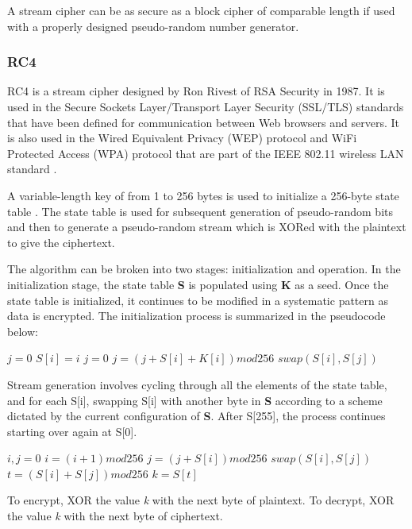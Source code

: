 \documentclass{article}
\begin{document}
A stream cipher can be as secure as a block cipher of comparable length if used with a properly designed pseudo-random number generator.

\subsubsection{RC4}
RC4 is a stream cipher designed by Ron Rivest of RSA Security in 1987. It is used in the Secure Sockets Layer/Transport Layer Security (SSL/TLS) standards that have been defined for communication between Web browsers and servers. It is also used in the Wired Equivalent Privacy (WEP) protocol and WiFi Protected Access (WPA) protocol that are part of the IEEE 802.11 wireless LAN standard \cite{stallings2011}.

A variable-length key of from 1 to 256 bytes is used to initialize a 256-byte state table \cite{mousa2006}. The state table is used for subsequent generation of pseudo-random bits and then to generate a pseudo-random stream which is XORed with the plaintext to give the ciphertext.

The algorithm can be broken into two stages: initialization and operation. In the initialization stage, the state table \textbf{S} is populated using \textbf{K} as a seed. Once the state table is initialized, it continues to be modified in a systematic pattern as data is encrypted. The initialization process is summarized in the pseudocode below:

\begin{algorithmic}
\State $j = 0$
	\State $S[i] = i$
\EndFor
\State $j = 0$
	\State $j = (j + S[i] + K[i]) mod 256$
	\State $swap(S[i], S[j])$
\EndFor
\end{algorithmic}

Stream generation involves cycling through all the elements of the state table, and for each S[i], swapping S[i] with another byte in \textbf{S} according to a scheme dictated by the current configuration of \textbf{S}. After S[255], the process continues starting over again at S[0].

\begin{algorithmic}
\State $i, j = 0$
	\State $i = (i + 1) mod 256$
	\State $j = (j + S[i]) mod 256$
	\State $swap(S[i], S[j])$
	\State $t = (S[i] + S[j]) mod 256$
	\State $k = S[t]$
\EndWhile
\end{algorithmic}

To encrypt, XOR the value \textit{k} with the next byte of plaintext. To decrypt, XOR the value \textit{k} with the next byte of ciphertext.
\end{document}
